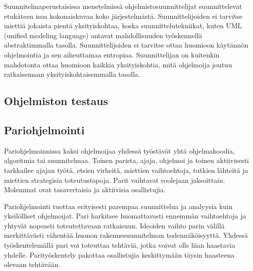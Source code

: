 \documentclass[finnish]{tktltiki2}
\theoremstyle{definition}
\theoremstyle{remark}
\begin{document}
Suunnitelmaperustaisissa menetelmissä ohjelmistosuunnittelijat suunnittelevat etukäteen isoa kokonaiskuvaa koko järjestelmästä. Suunnittelijoiden ei tarvitse miettiä jokaista pientä yksityiskohtaa, koska suunnittelutekniikat, kuten UML (unified modeling language) antavat mahdollisuuden työskennellä abstraktimmalla tasolla. Suunnittelijoiden ei tarvitse ottaa huomioon käytännön ohjelmointia ja sen aiheuttamaa entropiaa. Suunnittelijan on kuitenkin mahdotonta ottaa huomioon kaikkia yksityiskohtia, mitä ohjelmoija joutuu ratkaisemaan yksityiskohtaisemmalla tasolla\cite{FOW01b}.



\subsection{Ohjelmiston testaus}



\subsection{Pariohjelmointi}

Pariohjelmoinnissa kaksi ohjelmoijaa yhdessä työstävät yhtä ohjelmakoodia, algoritmia tai suunnitelmaa. Toinen parista, ajaja, ohjelmoi ja toinen aktiivisesti tarkkailee ajajan työtä, etsien virheitä, miettien vaihtoehtoja, tutkien lähteitä ja miettien strategisia toteutustapoja. Parit vaihtavat roolejaan jaksoittain. Molemmat ovat tasavertaisia ja aktiivisia osallistujia\cite{WIL00}. 

Pariohjelmointi tuottaa erityisesti parempaa suunnittelua ja analyysia kuin yksilölliset ohjelmoijat. Pari harkitsee huomattavasti ennemmän vaihtoehtoja ja yhtyvät nopeasti toteutettavaan ratkaisuun. Ideoiden vaihto parin välillä merkittävästi vähentää huonon rakennesuunnitelman todennäköisyyttä.  Yhdessä työskentelemällä pari voi toteuttaa tehtäviä, jotka voivat olls liian haastavia yhdelle. Parityöskentely pakottaa osallistujia keskittymään täysin haasteena olevaan tehtävään\cite{WIL00}.

%
%
% 
%



\end{document}
